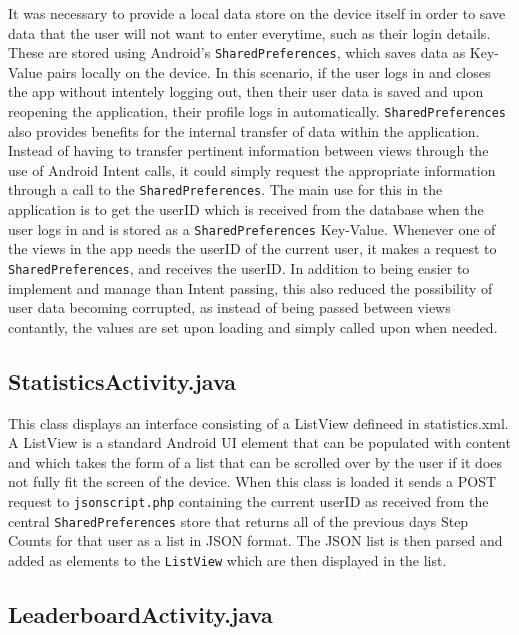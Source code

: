\documentclass{l4proj}
\begin{document}
It was necessary to provide a local data store on the device itself in order to save data that the user will not want to enter everytime, such as their login details. These are stored using Android's \texttt{SharedPreferences}, which saves data as Key-Value pairs locally on the device. In this scenario, if the user logs in and closes the app without intentely logging out, then their user data is saved and upon reopening the application, their profile logs in automatically. \texttt{SharedPreferences} also provides benefits for the internal transfer of data within the application. Instead of having to transfer pertinent information between views through the use of Android Intent calls, it could simply request the appropriate information through a call to the \texttt{SharedPreferences}. The main use for this in the application is to get the userID which is received from the database when the user logs in and is stored as a \texttt{SharedPreferences} Key-Value. Whenever one of the views in the app needs the userID of the current user, it makes a request to \texttt{SharedPreferences}, and receives the userID. In addition to being easier to implement and manage than Intent passing, this also reduced the possibility of user data becoming corrupted, as instead of being passed between views contantly, the values are set upon loading and simply called upon when needed.

\subsection{StatisticsActivity.java}

This class displays an interface consisting of a ListView defineed in statistics.xml. A ListView is a standard Android UI element that can be populated with content and which takes the form of a list that can be scrolled over by the user if it does not fully fit the screen of the device. When this class is loaded it sends a POST request to \texttt{jsonscript.php} containing the current userID as received from the central \texttt{SharedPreferences} store that returns all of the previous days Step Counts for that user as a list in JSON format. The JSON list is then parsed and added as elements to the \texttt{ListView} which are then displayed in the list.

\subsection{LeaderboardActivity.java}
\end{document}
